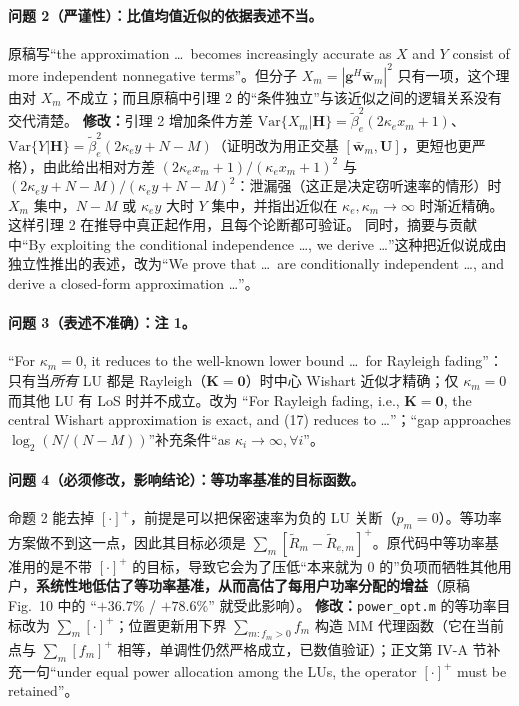 \documentclass[11pt,a4paper]{ctexart}
\newcommand{\code}[1]{\texttt{#1}}
\newcommand{\old}[1]{{\color{red!70!black}#1}}
\newcommand{\new}[1]{{\color{blue!60!black}#1}}
\begin{document}
\paragraph{问题 2（严谨性）：比值均值近似的依据表述不当。}
原稿写“the approximation \ldots\ becomes increasingly accurate as $X$ and $Y$ consist of more independent nonnegative terms”。但分子 $X_m=|\mathbf g^H\bar{\mathbf w}_m|^2$ 只有一项，这个理由对 $X_m$ 不成立；而且原稿中引理 2 的“条件独立”与该近似之间的逻辑关系没有交代清楚。
\textbf{修改：}引理 2 增加条件方差 $\mathrm{Var}\{X_m|\mathbf H\}=\tilde\beta_e^2(2\kappa_ex_m+1)$、$\mathrm{Var}\{Y|\mathbf H\}=\tilde\beta_e^2(2\kappa_ey+N-M)$（证明改为用正交基 $[\bar{\mathbf w}_m,\mathbf U]$，更短也更严格），由此给出相对方差 $(2\kappa_ex_m+1)/(\kappa_ex_m+1)^2$ 与 $(2\kappa_ey+N-M)/(\kappa_ey+N-M)^2$：泄漏强（这正是决定窃听速率的情形）时 $X_m$ 集中，$N-M$ 或 $\kappa_ey$ 大时 $Y$ 集中，并指出近似在 $\kappa_e,\kappa_m\to\infty$ 时渐近精确。这样引理 2 在推导中真正起作用，且每个论断都可验证。
同时，摘要与贡献中“By exploiting the conditional independence \ldots, we derive \ldots”这种把近似说成由独立性推出的表述，改为“We prove that \ldots\ are conditionally independent \ldots, and derive a closed-form approximation \ldots”。

\paragraph{问题 3（表述不准确）：注 1。}
\old{``For $\kappa_m=0$, it reduces to the well-known lower bound \ldots\ for Rayleigh fading''}：只有当\emph{所有} LU 都是 Rayleigh（$\mathbf K=\mathbf 0$）时中心 Wishart 近似才精确；仅 $\kappa_m=0$ 而其他 LU 有 LoS 时并不成立。改为 \new{``For Rayleigh fading, i.e., $\mathbf K=\mathbf 0$, the central Wishart approximation is exact, and (17) reduces to \ldots''}；“gap approaches $\log_2(N/(N-M))$”补充条件“as $\kappa_i\to\infty,\forall i$”。

\paragraph{问题 4（必须修改，影响结论）：等功率基准的目标函数。}
命题 2 能去掉 $[\cdot]^+$，前提是可以把保密速率为负的 LU 关断（$p_m=0$）。等功率方案做不到这一点，因此其目标必须是 $\sum_m[\tilde R_m-\tilde R_{e,m}]^+$。原代码中等功率基准用的是不带 $[\cdot]^+$ 的目标，导致它会为了压低“本来就为 0 的”负项而牺牲其他用户，\textbf{系统性地低估了等功率基准，从而高估了每用户功率分配的增益}（原稿 Fig.~10 中的 “$+36.7\%$ / $+78.6\%$” 就受此影响）。
\textbf{修改：}\code{power\_opt.m} 的等功率目标改为 $\sum_m[\cdot]^+$；位置更新用下界 $\sum_{m:f_m>0}f_m$ 构造 MM 代理函数（它在当前点与 $\sum_m[f_m]^+$ 相等，单调性仍然严格成立，已数值验证）；正文第 IV-A 节补充一句“under equal power allocation among the LUs, the operator $[\cdot]^+$ must be retained”。
\end{document}
